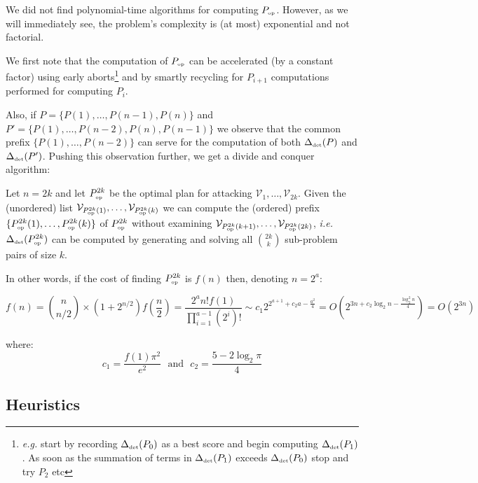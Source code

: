 \documentclass[11pt]{llncs}
\begin{document}
We did not find polynomial-time algorithms for computing $P_{\mbox{{\tiny op}}}$. However, as we will immediately see, the problem's complexity is (at most) exponential and not factorial.\smallskip

We first note that the computation of $P_{\mbox{{\tiny op}}}$ can be accelerated (by a constant factor) using early aborts\footnote{{\sl e.g.} start by recording $\Delta_{\mbox{{\tiny det}}}(P_0)$ as a best score and begin computing $\Delta_{\mbox{{\tiny det}}}(P_1)$. As soon as the summation of terms in $\Delta_{\mbox{{\tiny det}}}(P_1)$ exceeds $\Delta_{\mbox{{\tiny det}}}(P_0)$ stop and try $P_2$ etc} and by smartly recycling for $P_{i+1}$ computations performed for computing $P_i$.\smallskip

Also, if $P=\{P(1),\ldots,P(n-1),P(n)\}$ and $P'=\{P(1),\ldots,P(n-2),P(n),P(n-1)\}$ we observe that the common prefix $\{P(1),\ldots,P(n-2)\}$ can serve for the computation of both $\Delta_{\mbox{{\tiny det}}}(P)$ and $\Delta_{\mbox{{\tiny det}}}(P')$. Pushing this observation further, we get a divide and conquer algorithm: \smallskip

Let $n=2k$ and let $P_{\mbox{{\tiny op}}}^{2k}$ be the optimal plan for attacking $\mathcal{V}_1,\ldots,\mathcal{V}_{2k}$. Given the (unordered) list $\mathcal{V}_{P_{\mbox{{\tiny op}}}^{2k}(1)},\ldots,\mathcal{V}_{P_{\mbox{{\tiny op}}}^{2k}(k)}$ we can compute the (ordered) prefix $\{P_{\mbox{{\tiny op}}}^{2k}(1),\ldots,P_{\mbox{{\tiny op}}}^{2k}(k)\}$ of $P_{\mbox{{\tiny op}}}^{2k}$ without examining $\mathcal{V}_{P_{\mbox{{\tiny op}}}^{2k}(k+1)},\ldots,\mathcal{V}_{P_{\mbox{{\tiny op}}}^{2k}(2k)}$, {\sl i.e.} $\Delta_{\mbox{{\tiny det}}}(P_{\mbox{{\tiny op}}}^{2k})$ can be computed by generating and solving all $\binom{2k}{k}$ sub-problem pairs of size $k$.\smallskip

In other words, if the cost of finding $P_{\mbox{{\tiny op}}}^{2k}$ is $f(n)$ then, denoting $n=2^a$:

$$f(n)= \binom{n}{n/2} \times (1+2^{n/2}) f(\frac{n}2)
= \frac{2^a n! f(1)}{\prod_{i=1}^{a-1}(2^i)!} \sim c_1 2^{2^{a+1} + c_2 a - \frac{a^2}4}=
O(2^{3 n + c_2 \log_2 n- \frac{\log_2^2 n}4})=O(2^{3n})$$

where: $$c_1=\frac{f(1)\pi^2}{e^2}\mbox{~~and~~}c_2=\frac{5-2\log_2 \pi}4$$


	\subsection{Heuristics}
		
\end{document}
